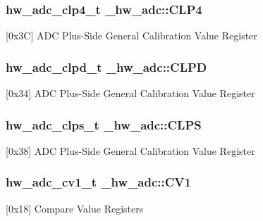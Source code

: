 \subsubsection[{\texorpdfstring{C\+L\+P4}{CLP4}}]{ {\bf hw\+\_\+adc\+\_\+clp4\+\_\+t} \+\_\+hw\+\_\+adc\+::\+C\+L\+P4}\hypertarget{struct__hw__adc_a4057fb376c2379347370a5d5df2d597d}{}\label{struct__hw__adc_a4057fb376c2379347370a5d5df2d597d}
\mbox{[}0x3C\mbox{]} A\+DC Plus-\/\+Side General Calibration Value Register 
\subsubsection[{\texorpdfstring{C\+L\+PD}{CLPD}}]{ {\bf hw\+\_\+adc\+\_\+clpd\+\_\+t} \+\_\+hw\+\_\+adc\+::\+C\+L\+PD}\hypertarget{struct__hw__adc_adaf4644020e5454c427067af1ffeab4d}{}\label{struct__hw__adc_adaf4644020e5454c427067af1ffeab4d}
\mbox{[}0x34\mbox{]} A\+DC Plus-\/\+Side General Calibration Value Register 
\subsubsection[{\texorpdfstring{C\+L\+PS}{CLPS}}]{ {\bf hw\+\_\+adc\+\_\+clps\+\_\+t} \+\_\+hw\+\_\+adc\+::\+C\+L\+PS}\hypertarget{struct__hw__adc_a6bf5d6e0cb50eba695d55fbe6631dc6a}{}\label{struct__hw__adc_a6bf5d6e0cb50eba695d55fbe6631dc6a}
\mbox{[}0x38\mbox{]} A\+DC Plus-\/\+Side General Calibration Value Register 
\subsubsection[{\texorpdfstring{C\+V1}{CV1}}]{ {\bf hw\+\_\+adc\+\_\+cv1\+\_\+t} \+\_\+hw\+\_\+adc\+::\+C\+V1}\hypertarget{struct__hw__adc_aba2f2d11c5b29e7d1ee7bf47957834dd}{}\label{struct__hw__adc_aba2f2d11c5b29e7d1ee7bf47957834dd}
\mbox{[}0x18\mbox{]} Compare Value Registers 
